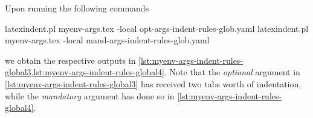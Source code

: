 	Upon running the following commands 
	\begin{commandshell}
latexindent.pl myenv-args.tex -local opt-args-indent-rules-glob.yaml
latexindent.pl myenv-args.tex -local mand-args-indent-rules-glob.yaml
\end{commandshell}
	we obtain the respective outputs in
	\cref{lst:myenv-args-indent-rules-global3,lst:myenv-args-indent-rules-global4}. Note that
	the \emph{optional} argument in \cref{lst:myenv-args-indent-rules-global3} has received
	two tabs worth of indentation, while the \emph{mandatory} argument has done so in
	\cref{lst:myenv-args-indent-rules-global4}.

	\begin{widepage}
		\begin{minipage}{.55\textwidth}
		\end{minipage}
		\hfill
		\begin{minipage}{.55\textwidth}
		\end{minipage}
	\end{widepage}
